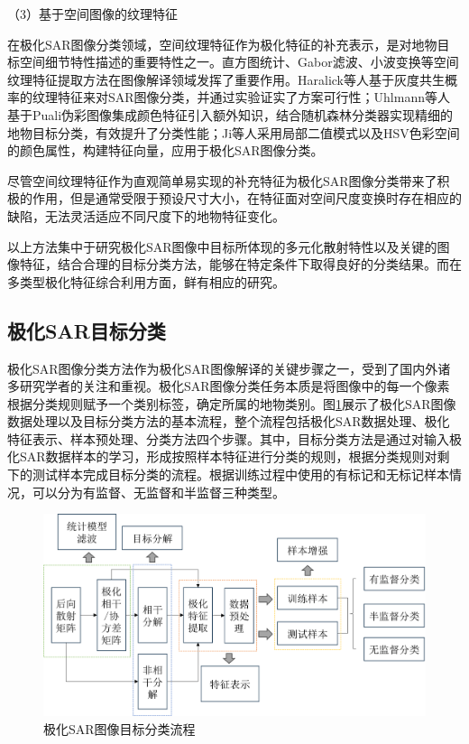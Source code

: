 （3）基于空间图像的纹理特征

在极化SAR图像分类领域，空间纹理特征作为极化特征的补充表示，是对地物目标空间细节特性描述的重要特性之一。直方图统计、Gabor滤波、小波变换等空间纹理特征提取方法在图像解译领域发挥了重要作用。Haralick等人基于灰度共生概率的纹理特征来对SAR图像分类，并通过实验证实了方案可行性；Uhlmann等人基于Puali伪彩图像集成颜色特征引入额外知识，结合随机森林分类器实现精细的地物目标分类，有效提升了分类性能；Ji等人采用局部二值模式以及HSV色彩空间的颜色属性，构建特征向量，应用于极化SAR图像分类。

尽管空间纹理特征作为直观简单易实现的补充特征为极化SAR图像分类带来了积极的作用，但是通常受限于预设尺寸大小，在特征面对空间尺度变换时存在相应的缺陷，无法灵活适应不同尺度下的地物特征变化。

以上方法集中于研究极化SAR图像中目标所体现的多元化散射特性以及关键的图像特征，结合合理的目标分类方法，能够在特定条件下取得良好的分类结果。而在多类型极化特征综合利用方面，鲜有相应的研究。

\subsection{极化SAR目标分类}
极化SAR图像分类方法作为极化SAR图像解译的关键步骤之一，受到了国内外诸多研究学者的关注和重视。极化SAR图像分类任务本质是将图像中的每一个像素根据分类规则赋予一个类别标签，确定所属的地物类别。图\ref{fig:极化SAR图像目标分类流程}展示了极化SAR图像数据处理以及目标分类方法的基本流程，整个流程包括极化SAR数据处理、极化特征表示、样本预处理、分类方法四个步骤。其中，目标分类方法是通过对输入极化SAR数据样本的学习，形成按照样本特征进行分类的规则，根据分类规则对剩下的测试样本完成目标分类的流程。根据训练过程中使用的有标记和无标记样本情况，可以分为有监督、无监督和半监督三种类型。

\begin{figure}[h]
    \includegraphics[width=12.3cm]{pic/chapter1/极化SAR分类流程.png}
    \caption{极化SAR图像目标分类流程}
    \label{fig:极化SAR图像目标分类流程}
\end{figure}


